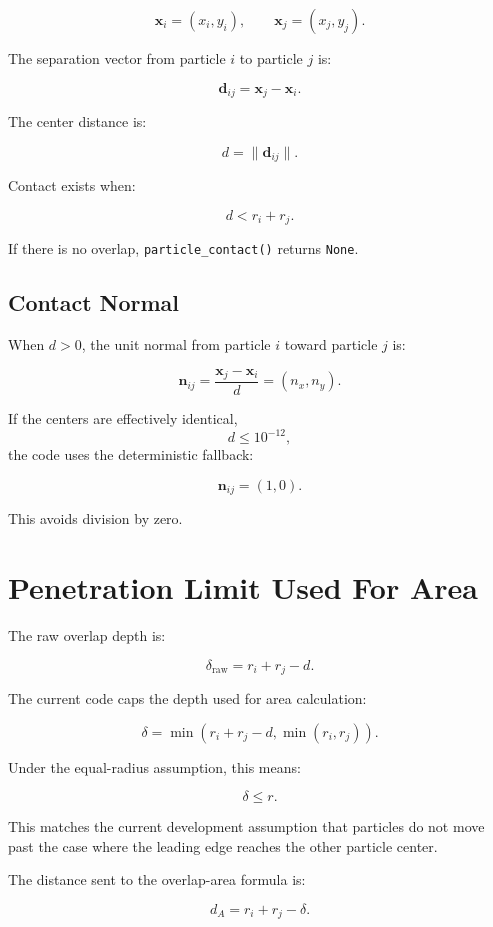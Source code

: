 \documentclass[11pt]{article}
\begin{document}
\[
    \mathbf{x}_i = (x_i,y_i),
    \qquad
    \mathbf{x}_j = (x_j,y_j).
\]

The separation vector from particle \(i\) to particle \(j\) is:

\[
    \mathbf{d}_{ij}
    =
    \mathbf{x}_j-\mathbf{x}_i.
\]

The center distance is:

\[
    d = \|\mathbf{d}_{ij}\|.
\]

Contact exists when:

\[
    d < r_i+r_j.
\]

If there is no overlap, \texttt{particle\_contact()} returns
\texttt{None}.

\subsection{Contact Normal}

When \(d>0\), the unit normal from particle \(i\) toward particle \(j\) is:

\[
    \mathbf{n}_{ij}
    =
    \frac{\mathbf{x}_j-\mathbf{x}_i}{d}
    =
    (n_x,n_y).
\]

If the centers are effectively identical,
\[
    d \le 10^{-12},
\]
the code uses the deterministic fallback:

\[
    \mathbf{n}_{ij}=(1,0).
\]

This avoids division by zero.

\section{Penetration Limit Used For Area}

The raw overlap depth is:

\[
    \delta_{\text{raw}}
    =
    r_i+r_j-d.
\]

The current code caps the depth used for area calculation:

\[
    \delta
    =
    \min\left(
        r_i+r_j-d,
        \min(r_i,r_j)
    \right).
\]

Under the equal-radius assumption, this means:

\[
    \delta \le r.
\]

This matches the current development assumption that particles do not move past
the case where the leading edge reaches the other particle center.

The distance sent to the overlap-area formula is:

\[
    d_A
    =
    r_i+r_j-\delta.
\]
\end{document}
